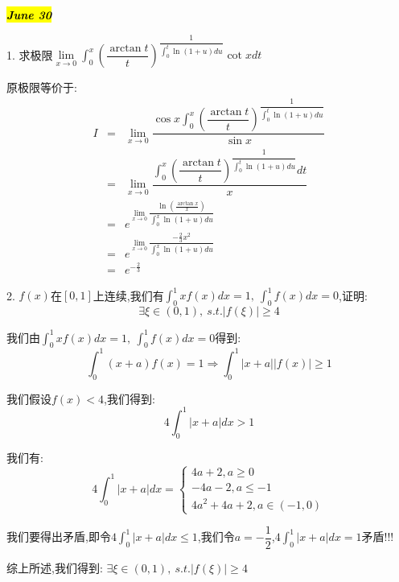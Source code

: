 
\hl{\textbf{\textit{June 30}}}

1. 求极限$\lim\limits_{x\rightarrow 0}\int_{0}^{x}(\dfrac{\arctan t}{t})^{\dfrac{1}{\int_{0}^{t}\ln(1+u)du}}\cot xdt$
\begin{solution}
	
	原极限等价于: 
	\begin{eqnarray*}
		I&=&\lim\limits_{x\rightarrow 0}\dfrac{\cos x\int_{0}^{x}(\dfrac{\arctan t}{t})^{\dfrac{1}{\int_{0}^{t}\ln(1+u)du}}}{\sin x}\\
		&=&\lim\limits_{x\rightarrow 0}\dfrac{\int_{0}^{x}(\dfrac{\arctan t}{t})^{\dfrac{1}{\int_{0}^{t}\ln(1+u)du}}dt}{x}\\
		&=&e^{\lim\limits_{x\rightarrow 0}\dfrac{\ln(\frac{\arctan x}{x})}{\int_{0}^{x}\ln(1+u)du}}\\
		&=&e^{\lim\limits_{x\rightarrow 0}\dfrac{-\frac{2}{3}x^2}{\int_{0}^{x}\ln(1+u)du}}\\
		&=&e^{-\frac{2}{3}}
	\end{eqnarray*}
\end{solution}

2. $f(x)$在$[0,1]$上连续,我们有$\int_{0}^{1}xf(x)dx=1,\ \int_{0}^{1}f(x)dx=0$,证明: $$\exists\xi\in(0,1),\ s.t. |f(\xi)|\geq 4$$
\begin{solution}
	
	我们由$\int_{0}^{1}xf(x)dx=1,\ \int_{0}^{1}f(x)dx=0$得到: 
	$$\int_{0}^{1}(x+a)f(x)=1\Rightarrow \int_{0}^{1}|x+a||f(x)|\geq 1$$
	
	我们假设$f(x)<4$,我们得到: 
	$$4\int_{0}^{1}|x+a|dx>1$$
	
	我们有: $$4\int_{0}^{1}|x+a|dx=\left\lbrace
	\begin{array}{l}
		4a+2,a\geq 0\\
		-4a-2,a\leq -1\\
		4a^2+4a+2,a\in(-1,0)
	\end{array}
	\right. $$
	
	我们要得出矛盾,即令$4\int_{0}^{1}|x+a|dx\leq 1$,我们令$a=-\dfrac{1}{2}$,$4\int_{0}^{1}|x+a|dx=1$矛盾!!!
	
	综上所述,我们得到: $\exists\xi\in(0,1),\ s.t. |f(\xi)|\geq 4$
\end{solution}

